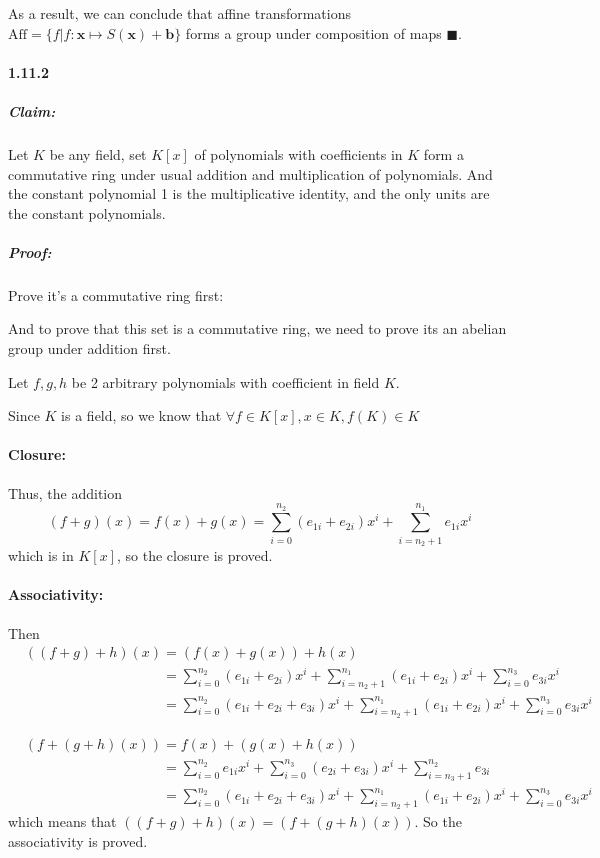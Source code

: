 \documentclass[11pt]{article}
\begin{document}
			As a result, we can conclude that affine transformations $\mathrm{Aff} = \{f | f:\textbf{x}\mapsto S(\textbf{x}) + \textbf{b}\}$ forms a group under composition of maps $\blacksquare$.
	\paragraph{1.11.2}
		\subparagraph{Claim:} Let $K$ be any field, set $K[x]$ of polynomials with coefficients in $K$ form a commutative ring under usual addition and multiplication of polynomials. And the constant polynomial 1 is the multiplicative identity, and the only units are the constant polynomials.
		\subparagraph{Proof:} Prove it's a commutative ring first:
		
		 And to prove that this set is a commutative ring, we need to prove its an abelian group under addition first.
		 
		 Let $f, g, h$ be 2 arbitrary polynomials with coefficient in field $K$. 
		 
		 Since $K$ is a field, so we know that $\forall f \in K[x], x \in K, f(K) \in K$
		 
		 \paragraph{Closure:}

		 	Thus, the addition
		 	\[(f + g)(x) = f(x) + g(x) = \sum_{i = 0}^{n_2} (e_{1i} + e_{2i})x^i + \sum_{i = n_2 + 1}^{n_1} e_{1i}x^i\] 
		 	which is in $K[x]$, so the closure is proved.
		 	
		 \paragraph{Associativity:}
		 	
		 	Then
		 	\begin{align}
		 		&((f + g) + h)(x) = (f(x) + g(x)) + h(x)\nonumber\\
		 		&\phantom{((f + g) + h)(x)} = \sum_{i = 0}^{n_2} (e_{1i} + e_{2i})x^i + \sum_{i = n_2 + 1}^{n_1} (e_{1i} + e_{2i})x^i + \sum_{i = 0}^{n_3} e_{3i}x^i\nonumber\\
		 		&\phantom{((f + g) + h)(x)} = \sum_{i = 0}^{n_2} (e_{1i} + e_{2i} + e_{3i})x^i + \sum_{i = n_2 + 1}^{n_1} (e_{1i} + e_{2i})x^i + \sum_{i = 0}^{n_3} e_{3i}x^i\nonumber
			\end{align}
			
			\begin{align}
				&(f + (g + h)(x)) = f(x) + (g(x) + h(x))\nonumber\\
				&\phantom{(f + (g + h)(x))} = \sum_{i = 0}^{n_2}e_{1i}x^i + \sum_{i = 0}^{n_3} (e_{2i} + e_{3i})x^i + \sum_{i = n_3 + 1}^{n_2}e_{3i} \nonumber\\
				&\phantom{(f + (g + h)(x))} = \sum_{i = 0}^{n_2} (e_{1i} + e_{2i} + e_{3i})x^i + \sum_{i = n_2 + 1}^{n_1} (e_{1i} + e_{2i})x^i + \sum_{i = 0}^{n_3} e_{3i}x^i\nonumber
			\end{align}
			which means that $((f + g) + h)(x) = (f + (g + h)(x))$. So the associativity is proved.
			
\end{document}

